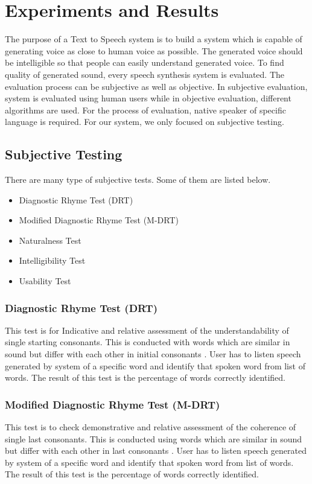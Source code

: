 \chapter{Experiments and Results}

The purpose of a Text to Speech system is to build a system which is capable of generating voice as close to human voice as possible. The generated voice should be intelligible so that people can easily understand generated voice. To find quality of generated sound, every speech synthesis system is evaluated. The evaluation process can be subjective as well as objective. In subjective evaluation, system is evaluated using human users while in objective evaluation, different algorithms are used. For the process of evaluation, native speaker of specific language is required. For our system, we only focused on subjective testing.

\section{Subjective Testing}

There are many type of subjective tests. Some of them are listed below.

\begin{itemize}
  \item Diagnostic Rhyme Test (DRT)
  \item Modified Diagnostic Rhyme Test (M-DRT)
  \item Naturalness Test
  \item Intelligibility Test
  \item Usability Test
\end{itemize}

\subsection{Diagnostic Rhyme Test (DRT)}
This test is for Indicative and relative assessment of the understandability of single starting consonants. This is conducted with words which are similar in sound but differ with each other in initial consonants \cite{voiers1977diagnostic}. User has to listen speech generated by system of a specific word and identify that spoken word from list of words. The result of this test is the percentage of words correctly identified.

\subsection{Modified Diagnostic Rhyme Test (M-DRT)}
This test is to check demonstrative and relative assessment of the coherence of single last consonants. This is conducted using words which are similar in sound but differ with each other in last consonants \cite{house1965articulation}. User has to listen speech generated by system of a specific word and identify that spoken word from list of words. The result of this test is the percentage of words correctly identified.

